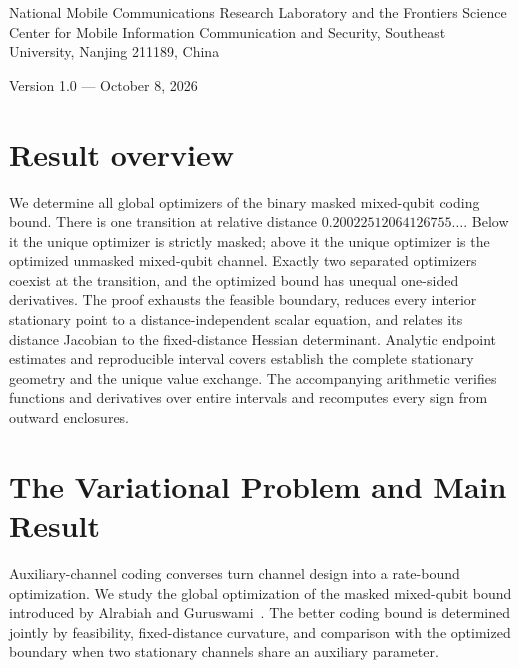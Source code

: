 \documentclass[12pt,letterpaper,onecolumn]{article}
\theoremstyle{definition}
\begin{document}
\par\medskip
{}\medskip
{}\par\smallskip
\noindent\begin{minipage}{\linewidth}\small National Mobile Communications Research Laboratory and the Frontiers Science Center for Mobile Information Communication and Security, Southeast University, Nanjing 211189, China\end{minipage}\par\medskip
\noindent Version 1.0 --- October 8, 2026\par\bigskip
{}
\section*{Result overview}
We determine all global optimizers of the binary masked mixed-qubit coding bound. There is one transition at relative distance \(0.20022512064126755\ldots\). Below it the unique optimizer is strictly masked; above it the unique optimizer is the optimized unmasked mixed-qubit channel. Exactly two separated optimizers coexist at the transition, and the optimized bound has unequal one-sided derivatives. The proof exhausts the feasible boundary, reduces every interior stationary point to a distance-independent scalar equation, and relates its distance Jacobian to the fixed-distance Hessian determinant. Analytic endpoint estimates and reproducible interval covers establish the complete stationary geometry and the unique value exchange. The accompanying arithmetic verifies functions and derivatives over entire intervals and recomputes every sign from outward enclosures.
\section{The Variational Problem and Main Result}
Auxiliary-channel coding converses turn channel design into a rate-bound optimization. We study the global optimization of the masked mixed-qubit bound introduced by Alrabiah and Guruswami~\cite{AlrabiahGuruswami2026}. The better coding bound is determined jointly by feasibility, fixed-distance curvature, and comparison with the optimized boundary when two stationary channels share an auxiliary parameter.
\end{document}
